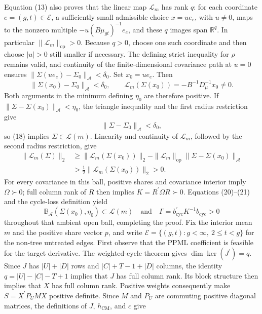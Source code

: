 Equation (13) also proves that the linear map \(\mathcal L_m\) has rank \(q\): for each coordinate \(e=(g,t)\in\mathcal E\), a sufficiently small admissible choice \(x=ue_e\), with \(u\ne0\), maps to the nonzero multiple
\(-u(B\mu_{gt})^{-1}e_e\), and these \(q\) images span \(\mathbb R^q\).  In particular \(\|\mathcal L_m\|_{\mathrm{op}}>0\).  Because \(q>0\), choose one such coordinate and then choose \(|u|>0\) still smaller if necessary.  The defining strict inequality for \(\rho\) remains valid, and continuity of the finite-dimensional covariance path at \(u=0\) ensures
\(\|\Sigma(ue_e)-\Sigma_0\|_{\mathcal A}<\delta_0\).  Set \(x_0=ue_e\).  Then
\[
\|\Sigma(x_0)-\Sigma_0\|_{\mathcal A}<\delta_0,
\qquad
\mathcal L_m(\Sigma(x_0))
=-B^{-1}D_\mu^{-1}x_0\ne0.                            \tag{19}
\]
Both arguments in the minimum defining \(\eta_0\) are therefore positive.  If
\(\|\Sigma-\Sigma(x_0)\|_{\mathcal A}<\eta_0\), the triangle inequality and the first radius restriction give
\[
\|\Sigma-\Sigma_0\|_{\mathcal A}<\delta_0,            \tag{20}
\]
so (18) implies \(\Sigma\in\mathcal L(m)\).  Linearity and continuity of \(\mathcal L_m\), followed by the second radius restriction, give
\[
\begin{aligned}
\|\mathcal L_m(\Sigma)\|_2
&\ge \|\mathcal L_m(\Sigma(x_0))\|_2
-\|\mathcal L_m\|_{\mathrm{op}}
  \|\Sigma-\Sigma(x_0)\|_{\mathcal A}\\
&>\tfrac12\|\mathcal L_m(\Sigma(x_0))\|_2>0.         \tag{21}
\end{aligned}
\]
For every covariance in this ball, positive shares and covariance interior imply \(\Omega\succ0\); full column rank of \(R\) then implies \(K=R^{\prime}\Omega R\succ0\).  Equations (20)--(21) and the cycle-loss definition yield
\[
\mathbb B_{\mathcal A}(\Sigma(x_0),\eta_0)
\subset\mathcal L(m)
\quad\text{and}\quad
\Gamma=b_{\mathrm{cyc}}^{\prime}K^{-1}b_{\mathrm{cyc}}>0
\]
throughout that ambient open ball, completing the proof.
Fix the interior mean \(m\) and the positive share vector \(p\), and write
\(\mathcal E=\{(g,t):g<\infty,\ 2\le t<g\}\) for the non-tree untreated edges.  First observe that the PPML coefficient is feasible for the target derivative.  The weighted-cycle theorem gives \(\dim\ker(J^{\prime})=q\).  Since \(J\) has \(|U|+|D|\) rows and \(|C|+T-1+|D|\) columns, the identity \(q=|U|-|C|-T+1\) implies that \(J\) has full column rank.  Its block structure then implies that \(X\) has full column rank.  Positive weights consequently make
\(S=X^{\prime}P_UMX\) positive definite.  Since \(M\) and \(P_U\) are commuting positive diagonal matrices, the definitions of \(J\), \(h_{\mathrm{CM}}\), and \(c\) give
